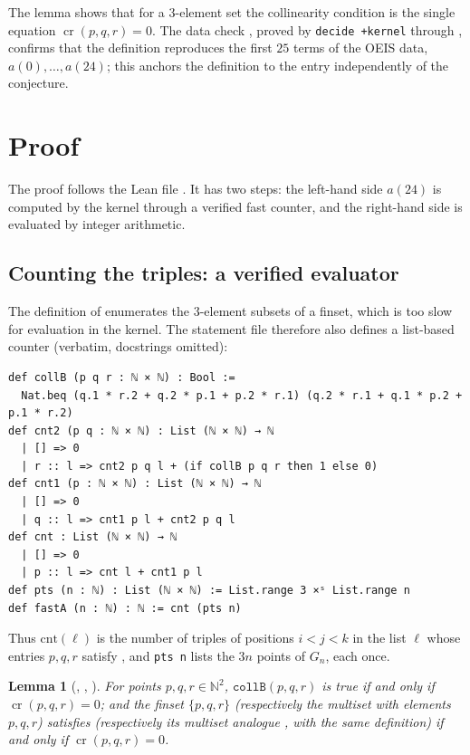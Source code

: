 \documentclass[11pt]{amsart}
\theoremstyle{plain}
\newtheorem{lemma}[theorem]{Lemma}
\theoremstyle{definition}
\newcommand{\N}{\mathbb{N}}
\newcommand{\cross}{\operatorname{cr}}
\begin{document}
The lemma  shows that for a $3$-element set the collinearity condition is the single equation $\cross(p,q,r)=0$. The data check , proved by \texttt{decide +kernel} through , confirms that the definition reproduces the first $25$ terms of the OEIS data, $a(0),\dots,a(24)$; this anchors the definition to the entry independently of the conjecture.

\section{Proof}\label{sec:proof}

The proof follows the Lean file . It has two steps: the left-hand side $a(24)$ is computed by the kernel through a verified fast counter, and the right-hand side is evaluated by integer arithmetic.

\subsection{Counting the triples: a verified evaluator}
The definition of  enumerates the $3$-element subsets of a finset, which is too slow for evaluation in the kernel. The statement file therefore also defines a list-based counter (verbatim, docstrings omitted):
\begin{lstlisting}
def collB (p q r : ℕ × ℕ) : Bool :=
  Nat.beq (q.1 * r.2 + q.2 * p.1 + p.2 * r.1) (q.2 * r.1 + q.1 * p.2 + p.1 * r.2)
def cnt2 (p q : ℕ × ℕ) : List (ℕ × ℕ) → ℕ
  | [] => 0
  | r :: l => cnt2 p q l + (if collB p q r then 1 else 0)
def cnt1 (p : ℕ × ℕ) : List (ℕ × ℕ) → ℕ
  | [] => 0
  | q :: l => cnt1 p l + cnt2 p q l
def cnt : List (ℕ × ℕ) → ℕ
  | [] => 0
  | p :: l => cnt l + cnt1 p l
def pts (n : ℕ) : List (ℕ × ℕ) := List.range 3 ×ˢ List.range n
def fastA (n : ℕ) : ℕ := cnt (pts n)
\end{lstlisting}
Thus $\mathrm{cnt}(\ell)$ is the number of triples of positions $i<j<k$ in the list $\ell$ whose entries $p,q,r$ satisfy , and \texttt{pts n} lists the $3n$ points of $G_n$, each once.

\begin{lemma}[, , ]\label{lem:coll}
For points $p,q,r\in\N^2$, $\mathtt{collB}(p,q,r)$ is true if and only if $\cross(p,q,r)=0$; and the finset $\{p,q,r\}$ (respectively the multiset with elements $p,q,r$) satisfies  (respectively its multiset analogue , with the same definition) if and only if $\cross(p,q,r)=0$.
\end{lemma}
\end{document}
